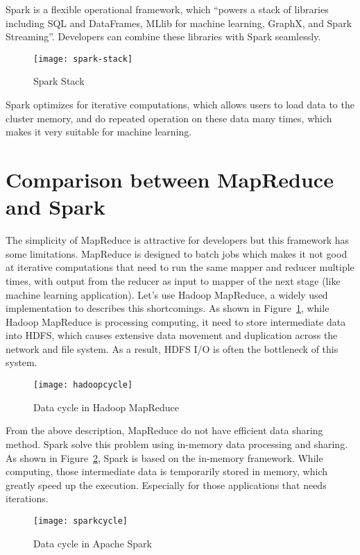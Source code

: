 Spark is a flexible operational framework, which ``powers a stack of libraries including SQL and DataFrames, MLlib for machine learning, GraphX, and Spark Streaming''\cite{apache_spark}. Developers can combine these libraries with Spark seamlessly.
\begin{figure}[h]
	\centering
	\texttt{[image: spark-stack]}
	\caption{Spark Stack}
\end{figure}


Spark optimizes for iterative computations, which allows users to load data to the cluster memory, and do repeated operation on these data many times, which makes it very suitable for machine learning\cite{meng2016mllib}.

\section{Comparison between MapReduce and Spark}
The simplicity of MapReduce is attractive for developers but this framework has some limitations. MapReduce is designed to batch jobs which makes it not good at iterative computations that need to run the same mapper and reducer multiple times, with output from the reducer as input to mapper of the next stage (like machine learning application)\cite{shi2015clash}. Let's use Hadoop MapReduce, a widely used implementation to describes this shortcomings. As shown in Figure~\ref{fg:hadoop}, while Hadoop MapReduce is processing computing, it need to store intermediate data into HDFS, which causes extensive data movement and duplication across the network and file system. As a result, HDFS I/O is often the bottleneck of this system.

\begin{figure}[h]
	\centering
	\texttt{[image: hadoopcycle]}
	\caption{Data cycle in Hadoop MapReduce}
	\label{fg:hadoop}
\end{figure}

From the above description, MapReduce do not have efficient data sharing method. Spark solve this problem using in-memory data processing and sharing\cite{apache_spark}. As shown in Figure~\ref{fg:spark}, Spark is based on the in-memory framework. While computing, those intermediate data is temporarily stored in memory, which greatly speed up the execution. Especially for those applications that needs iterations.

\begin{figure}[h]
	\centering
	\texttt{[image: sparkcycle]}
	\caption{Data cycle in Apache Spark}
	\label{fg:spark}
\end{figure}

